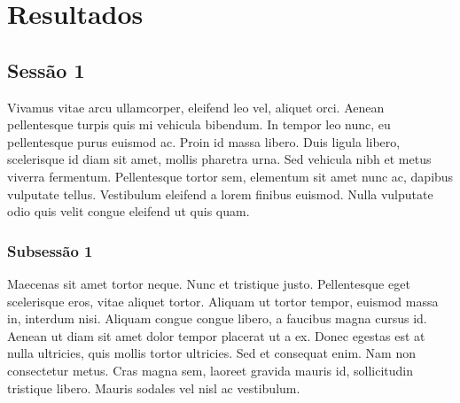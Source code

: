 \chapter{Resultados} \label{resultado}

\section{Sessão 1}
% 

Vivamus vitae arcu ullamcorper, eleifend leo vel, aliquet orci. Aenean pellentesque turpis quis mi vehicula bibendum. In tempor leo nunc, eu pellentesque purus euismod ac. Proin id massa libero. Duis ligula libero, scelerisque id diam sit amet, mollis pharetra urna. Sed vehicula nibh et metus viverra fermentum. Pellentesque tortor sem, elementum sit amet nunc ac, dapibus vulputate tellus. Vestibulum eleifend a lorem finibus euismod. Nulla vulputate odio quis velit congue eleifend ut quis quam.


\subsection{Subsessão 1}

Maecenas sit amet tortor neque. Nunc et tristique justo. Pellentesque eget scelerisque eros, vitae aliquet tortor. Aliquam ut tortor tempor, euismod massa in, interdum nisi. Aliquam congue congue libero, a faucibus magna cursus id. Aenean ut diam sit amet dolor tempor placerat ut a ex. Donec egestas est at nulla ultricies, quis mollis tortor ultricies. Sed et consequat enim. Nam non consectetur metus. Cras magna sem, laoreet gravida mauris id, sollicitudin tristique libero. Mauris sodales vel nisl ac vestibulum.

\clearpage
